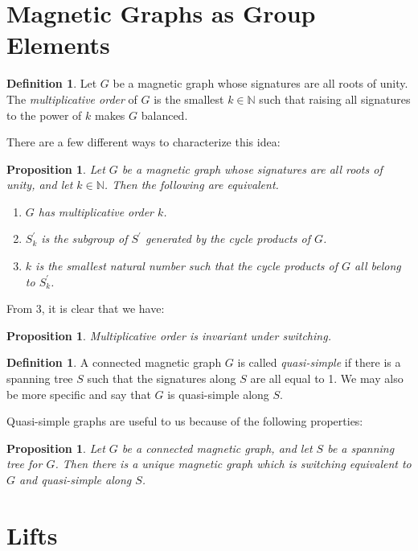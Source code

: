 \documentclass[12pt]{article}
\newtheorem{prop}[thm]{Proposition}
\theoremstyle{definition}
\newtheorem{defn}[thm]{Definition}
\newcommand{\N}{\mathbb N}
\begin{document}
\pagebreak
\section{Magnetic Graphs as Group Elements}
\begin{defn}
Let $G$ be a magnetic graph whose signatures are all roots of unity. The \textit{multiplicative order} of $G$ is the smallest $k \in \N$ such that raising all signatures to the power of $k$ makes $G$ balanced.
\end{defn}

There are a few different ways to characterize this idea:

\begin{prop}\label{characterizations of multiplicative order}
Let $G$ be a magnetic graph whose signatures are all roots of unity, and let $k \in \N$.  Then the following are equivalent.
\begin{enumerate}
\item $G$ has multiplicative order $k$.
\item $S^\prime_k$ is the subgroup of $S^\prime$ generated by the cycle products of $G$.
\item $k$ is the smallest natural number such that the cycle products of $G$ all belong to $S^\prime_k$. 
\end{enumerate}
\end{prop}

From 3, it is clear that we have:

\begin{prop}
Multiplicative order is invariant under switching.
\end{prop}

\begin{defn}
A connected magnetic graph $G$ is called \textit{quasi-simple} if there is a spanning tree $S$ such that the signatures along $S$ are all equal to 1. We may also be more specific and say that $G$ is quasi-simple along $S$.
\end{defn}

Quasi-simple graphs are useful to us because of the following properties:



\begin{prop}
Let $G$ be a connected magnetic graph, and let $S$ be a spanning tree for $G$. Then there is a unique magnetic graph which is switching equivalent to $G$ and quasi-simple along $S$.
\end{prop}

\pagebreak
\section{Lifts}
\end{document}
